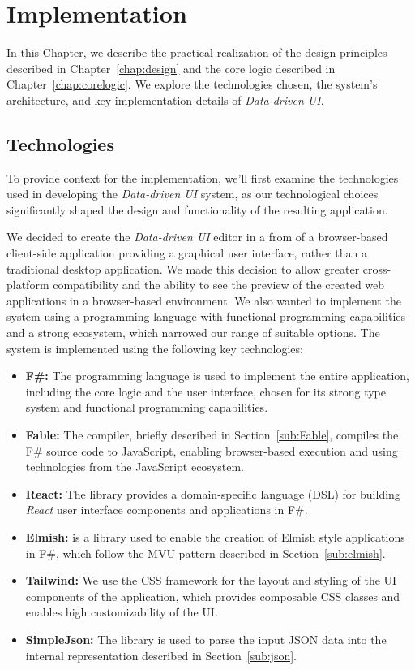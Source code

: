 \chapter{Implementation}
\label{chap:implementation}

In this Chapter, we describe the practical realization of the design principles described in Chapter~\ref{chap:design} and the core logic described in Chapter~\ref{chap:corelogic}.
We explore the technologies chosen, the system's architecture, and key implementation details of \emph{Data-driven UI}.


\section{Technologies}
\label{sec:technologies}
To provide context for the implementation, we'll first examine the technologies used in developing the \emph{Data-driven UI} system, as our technological choices significantly shaped the design and functionality of the resulting application.

We decided to create the \emph{Data-driven UI} editor in a from of a browser-based client-side application providing a graphical user interface, rather than a traditional desktop application.
We made this decision to allow greater cross-platform compatibility and the ability to see the preview of the created web applications in a browser-based environment.
We also wanted to implement the system using a programming language with functional programming capabilities and a strong ecosystem, which narrowed our range of suitable options.
The system is implemented using the following key technologies:
\begin{itemize}
	\item \textbf{F\#:} The \citet{fsharp} programming language is used to implement the entire application, including the core logic and the user interface, chosen for its strong type system and functional programming capabilities.
	\item \textbf{Fable:} The \citet{fable} compiler, briefly described in Section~\ref{sub:Fable}, compiles the F\# source code to JavaScript, enabling browser-based execution and using technologies from the JavaScript ecosystem.
	\item \textbf{React:} The \citet{feliz} library provides a domain-specific language (DSL) for building \emph{React} user interface components and applications in F\#.
	\item \textbf{Elmish:} \citet{elmish} is a library used to enable the creation of Elmish style applications in F\#, which follow the MVU pattern described in Section~\ref{sub:elmish}.
	\item \textbf{Tailwind:} We use the \citet{tailwind} CSS framework for the layout and styling of the UI components of the application, which provides composable CSS classes and enables high customizability of the UI.
	\item \textbf{SimpleJson:} The \citet{simpleJson} library is used to parse the input JSON data into the internal representation described in Section~\ref{sub:json}.
\end{itemize}


